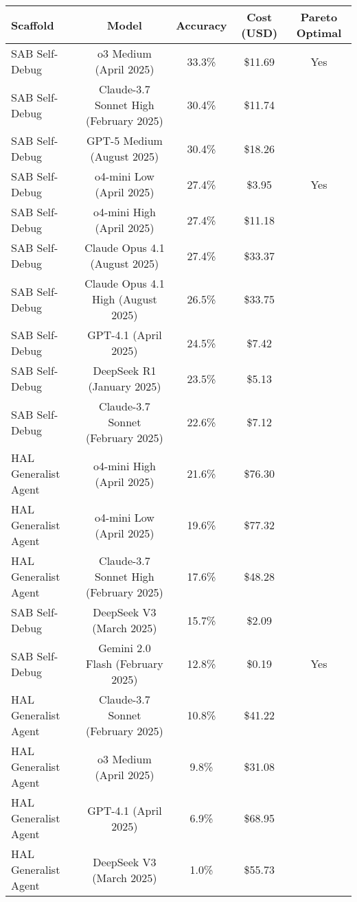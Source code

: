 \begin{tabular}{lcccc}
\toprule
Scaffold & Model & Accuracy & Cost (USD) & Pareto Optimal \\
\midrule
SAB Self-Debug & o3 Medium (April 2025) & 33.3\% & \$11.69 & Yes \\
SAB Self-Debug & Claude-3.7 Sonnet High (February 2025) & 30.4\% & \$11.74 &  \\
SAB Self-Debug & GPT-5 Medium (August 2025) & 30.4\% & \$18.26 &  \\
SAB Self-Debug & o4-mini Low (April 2025) & 27.4\% & \$3.95 & Yes \\
SAB Self-Debug & o4-mini High (April 2025) & 27.4\% & \$11.18 &  \\
SAB Self-Debug & Claude Opus 4.1 (August 2025) & 27.4\% & \$33.37 &  \\
SAB Self-Debug & Claude Opus 4.1 High (August 2025) & 26.5\% & \$33.75 &  \\
SAB Self-Debug & GPT-4.1 (April 2025) & 24.5\% & \$7.42 &  \\
SAB Self-Debug & DeepSeek R1 (January 2025) & 23.5\% & \$5.13 &  \\
SAB Self-Debug & Claude-3.7 Sonnet (February 2025) & 22.6\% & \$7.12 &  \\
HAL Generalist Agent & o4-mini High (April 2025) & 21.6\% & \$76.30 &  \\
HAL Generalist Agent & o4-mini Low (April 2025) & 19.6\% & \$77.32 &  \\
HAL Generalist Agent & Claude-3.7 Sonnet High (February 2025) & 17.6\% & \$48.28 &  \\
SAB Self-Debug & DeepSeek V3 (March 2025) & 15.7\% & \$2.09 &  \\
SAB Self-Debug & Gemini 2.0 Flash (February 2025) & 12.8\% & \$0.19 & Yes \\
HAL Generalist Agent & Claude-3.7 Sonnet (February 2025) & 10.8\% & \$41.22 &  \\
HAL Generalist Agent & o3 Medium (April 2025) & 9.8\% & \$31.08 &  \\
HAL Generalist Agent & GPT-4.1 (April 2025) & 6.9\% & \$68.95 &  \\
HAL Generalist Agent & DeepSeek V3 (March 2025) & 1.0\% & \$55.73 &  \\
\bottomrule
\end{tabular}